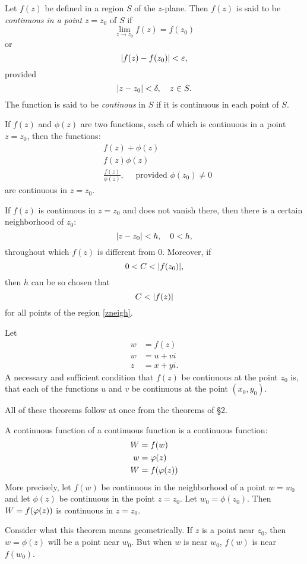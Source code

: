 \documentclass[twosided]{memoir}
\begin{document}
Let $f(z)$ be defined in a region $S$ of the $z$-plane. Then $f(z)$ is said to be \emph{continuous in a point} $z=z_0$ of $S$ if
\[
	\lim\limits_{z \to z_0} f(z)=f(z_0)
\] or
\[
	\abs*{f(z)-f(z_0)} <\epsilon,
\] provided
\[
\abs*{z-z_0} <\delta , \quad z \in S
.\] The function is said to be \emph{continous} in $S$ if it is continuous in each point of $S$. 

If $f(z)$ and $\phi (z)$ are two functions, each of which is continuous in a point $z=z_0$, then the functions:
\begin{align*}
&f(z)+\phi (z)\\
&f(z)\phi (z)\\
&\frac{f(z)}{\phi (z)} ,\quad \text{ provided } \phi (z_0)\neq 0
\end{align*}
are continuous in $z=z_0$. 

If $f(z)$ is continuous in $z=z_0$ and does not vanish there, then there is a certain neighborhood of $z_0$:
\begin{equation}\label{zneigh}
\abs*{z-z_0} <h, \quad 0<h,
\end{equation}
throughout which $f(z)$ is different from $0$. Moreover, if
\[
	0<C<\abs*{f(z_0)} 
,\] then $h$ can be so chosen that
\[
	C<\abs*{f(z)} 
\] for all points of the region \ref{zneigh}. 

Let
\begin{align*}
	w&=f(z)\\
	w&=u+vi\\
	z&=x+yi.
\end{align*} A necessary and sufficient condition that $f(z)$ be continuous at the point $z_0$ is, that each of the functions $u$ and $v$ be continuous at the point $(x_0, y_0)$. 

All of these theorems follow at once from the theorems of \S 2. 

\begin{theorem}
A continuous function of a continuous function is a continuous function:
\begin{align*}
	W&=f(w)\\
	w&=\phi (z)\\
	W&=f\pbr*{\phi (z)} 
\end{align*} More precisely, let $f(w)$ be continuous in the neighborhood of a point $w=w_0$ and let $\phi (z)$ be continuous in the point $z=z_0$. Let $w_0=\phi (z_0)$. Then $W=f\pbr*{\phi (z)} $ is continuous in $z=z_0$.
\end{theorem} 

Consider what this theorem means geometrically. If $z$ is a point near $z_0$, then $w=\phi (z)$ will be a point near $w_0$. But when $w$ is near $w_0$, $f(w)$ is near $f(w_0)$. 
\end{document}
